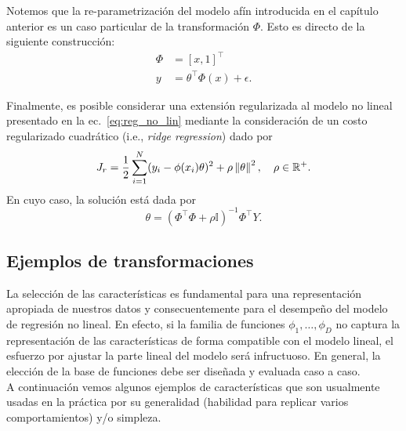 \begin{remark}
Notemos que la re-parametrización del modelo afín introducida en el capítulo anterior es un caso particular de la transformación $\Phi$. Esto es directo de la siguiente construcción:
\begin{align*}
    \Phi &= [x, 1]^\top\\
    y &= \theta^\top\Phi(x)+ \epsilon.
\end{align*}
\end{remark}


\begin{remark}
    Finalmente, es posible considerar una extensión regularizada al modelo no lineal presentado en la   ec.~\eqref{eq:reg_no_lin} mediante la consideración de un costo regularizado cuadrático (i.e., \emph{ridge regression}) dado por 
\begin{equation}
    J_r = \frac{1}{2} \sum_{i=1}^N(y_i - \phi(x_i)\theta)^2 + \rho\left \| \theta \right \|^2,\quad \rho\in{\mathbb R}^+.
\end{equation}
En cuyo caso, la solución está dada por
\begin{equation}
    \theta = (\Phi^\top\Phi+\rho\mathbb{I})^{-1}\Phi^\top Y.
\end{equation}
\end{remark}


\subsection{Ejemplos de transformaciones}

La selección de las características es fundamental para una representación apropiada de nuestros datos y consecuentemente para el desempeño del modelo de regresión no lineal. En efecto, si la familia de funciones $\phi_1,\ldots,\phi_D$ no captura la representación de las características de forma compatible con el modelo lineal, el esfuerzo por ajustar la parte lineal del modelo será infructuoso. En general, la elección de la base de funciones debe ser diseñada y evaluada caso a caso.\\

A continuación vemos algunos ejemplos de características que son usualmente usadas en la práctica por su generalidad (habilidad para replicar varios comportamientos) y/o simpleza.\\

